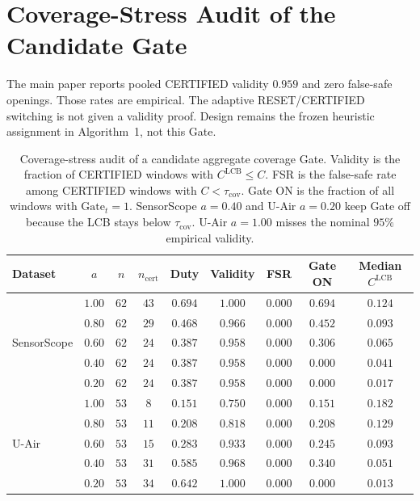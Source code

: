 \section{Coverage-Stress Audit of the Candidate Gate}
\label{app:certificate_audit}

The main paper reports pooled CERTIFIED validity $0.959$ and zero
false-safe openings.  Those rates are empirical.  The adaptive
RESET/CERTIFIED switching is not given a validity proof.
Design remains the frozen heuristic assignment in
Algorithm~1, not this Gate.

\begin{table}[t]
\centering
\caption{Coverage-stress audit of a candidate aggregate coverage Gate.
Validity is the fraction of CERTIFIED windows with
$C^{\mathrm{LCB}}\le C$.  FSR is the false-safe rate among CERTIFIED
windows with $C<\tau_{\mathrm{cov}}$.  Gate ON is the fraction of all
windows with $\mathrm{Gate}_t=1$.  SensorScope $a=0.40$ and U-Air
$a=0.20$ keep Gate off because the LCB stays below $\tau_{\mathrm{cov}}$.
U-Air $a=1.00$ misses the nominal $95\%$ empirical validity.}
\label{tab:certificate_stress}
\scriptsize
\setlength{\tabcolsep}{3.2pt}
\begin{tabular}{lcccccccc}
\toprule
Dataset & $a$ & $n$ & $n_{\mathrm{cert}}$ & Duty & Validity & FSR & Gate ON & Median $C^{\mathrm{LCB}}$\\
\midrule
\multirow{5}{*}{SensorScope}
& $1.00$ & $62$ & $43$ & $0.694$ & $1.000$ & $0.000$ & $0.694$ & $0.124$\\
& $0.80$ & $62$ & $29$ & $0.468$ & $0.966$ & $0.000$ & $0.452$ & $0.093$\\
& $0.60$ & $62$ & $24$ & $0.387$ & $0.958$ & $0.000$ & $0.306$ & $0.065$\\
& $0.40$ & $62$ & $24$ & $0.387$ & $0.958$ & $0.000$ & $0.000$ & $0.041$\\
& $0.20$ & $62$ & $24$ & $0.387$ & $0.958$ & $0.000$ & $0.000$ & $0.017$\\
\midrule
\multirow{5}{*}{U-Air}
& $1.00$ & $53$ & $8$ & $0.151$ & $0.750$ & $0.000$ & $0.151$ & $0.182$\\
& $0.80$ & $53$ & $11$ & $0.208$ & $0.818$ & $0.000$ & $0.208$ & $0.129$\\
& $0.60$ & $53$ & $15$ & $0.283$ & $0.933$ & $0.000$ & $0.245$ & $0.093$\\
& $0.40$ & $53$ & $31$ & $0.585$ & $0.968$ & $0.000$ & $0.340$ & $0.051$\\
& $0.20$ & $53$ & $34$ & $0.642$ & $1.000$ & $0.000$ & $0.000$ & $0.013$\\
\bottomrule
\end{tabular}
\end{table}

